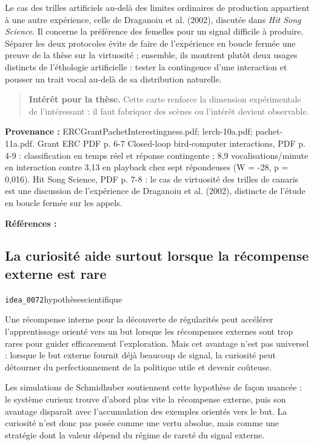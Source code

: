 \documentclass[10pt,a4paper]{article}
\begin{document}
Le cas des trilles artificiels au-delà des limites ordinaires de production appartient à une autre expérience, celle de Draganoiu et al. (2002), discutée dans \emph{Hit Song Science}. Il concerne la préférence des femelles pour un signal difficile à produire. Séparer les deux protocoles évite de faire de l'expérience en boucle fermée une preuve de la thèse sur la virtuosité ; ensemble, ils montrent plutôt deux usages distincts de l'éthologie artificielle : tester la contingence d'une interaction et pousser un trait vocal au-delà de sa distribution naturelle.

\begin{quote}
\textbf{Intérêt pour la thèse.} Cette carte renforce la dimension expérimentale de l'intéressant : il faut fabriquer des scènes ou l'intérêt devient observable.
\end{quote}
{\footnotesize\color{metadata}\textbf{Provenance :} ERCGrantPachetInterestingness.pdf; lerch-10a.pdf; pachet-11a.pdf. Grant ERC PDF p. 6-7 Closed-loop bird-computer interactions, PDF p. 4-9 : classification en temps réel et réponse contingente ; 8,9 vocalisations/minute en interaction contre 3,13 en playback chez sept répondeuses (W = -28, p = 0,016). Hit Song Science, PDF p. 7-8 : le cas de virtuosité des trilles de canaris est une discussion de l'expérience de Draganoiu et al. (2002), distincte de l'étude en boucle fermée sur les appels.\par}
{\footnotesize\color{metadata}\textbf{Références :} \parencite{lerch2011closedloop,pachet2011hitsong}\par}

\subsection{La curiosité aide surtout lorsque la récompense externe est rare}
{\small\color{metadata} \texttt{idea\_0072}\quad\textbullet\quad hypothèse\quad\textbullet\quad scientifique\par}

Une récompense interne pour la découverte de régularités peut accélérer l'apprentissage orienté vers un but lorsque les récompenses externes sont trop rares pour guider efficacement l'exploration. Mais cet avantage n'est pas universel : lorsque le but externe fournit déjà beaucoup de signal, la curiosité peut détourner du perfectionnement de la politique utile et devenir coûteuse.

Les simulations de Schmidhuber soutiennent cette hypothèse de façon nuancée : le système curieux trouve d'abord plus vite la récompense externe, puis son avantage disparaît avec l'accumulation des exemples orientés vers le but. La curiosité n'est donc pas posée comme une vertu absolue, mais comme une stratégie dont la valeur dépend du régime de rareté du signal externe.
\end{document}
